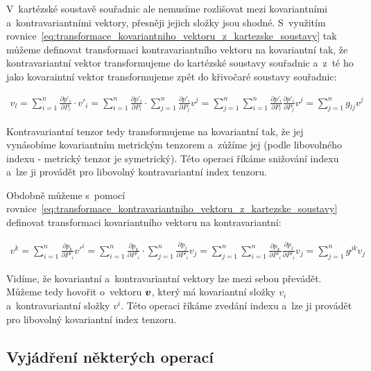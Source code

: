 V~kartézské soustavě souřadnic ale nemusíme rozlišovat mezi kovariantními a~kontravariantními vektory, přesněji jejich složky jsou shodné. S~využitím rovnice~\eqref{eq:transformace_kovariantniho_vektoru_z_kartezske_soustavy} tak můžeme definovat transformaci kontravariantního vektoru na kovariantní tak, že kontravariantní vektor transformujeme do kartézské soustavy souřadnic a~z~té ho jako kovaraintní vektor transformujeme zpět do křivočaré soustavy souřadnic:

\begin{equation}
\begin{split}
v_l = \sum_{i=1}^n \frac{\partial p'_i}{\partial P_l} \cdot v'_i = \sum_{i=1}^n \frac{\partial p'_i}{\partial P_l} \cdot \sum_{j=1}^n \frac{\partial p'_i}{\partial P_j} v^j = \sum_{j=1}^n \sum_{i=1}^n \frac{\partial p'_i}{\partial P_l} \frac{\partial p'_i}{\partial P_j} v^j = \sum_{j=1}^n g_{lj} v^j
\end{split}
\end{equation}

Kontravariantní tenzor tedy transformujeme na kovariantní tak, že jej vynásobíme kovariantním metrickým tenzorem a~zůžíme jej (podle libovolného indexu - metrický tenzor je symetrický). Této operaci říkáme snižování indexu a~lze ji provádět pro libovolný kontravariantní index tenzoru.

Obdobně můžeme s~pomocí rovnice~\eqref{eq:transformace_kontravariantniho_vektoru_z_kartezske_soustavy} definovat transformaci kovariantního vektoru na kontravariantní:

\begin{equation}
\begin{split}
v^k = \sum_{i=1}^n \frac{\partial p_k}{\partial P'_i} v'^i = \sum_{i=1}^n \frac{\partial p_k}{\partial P'_i} \cdot \sum_{j=1}^n \frac{\partial p_j}{\partial P'_i} v_j = \sum_{j=1}^n \sum_{i=1}^n \frac{\partial p_k}{\partial P'_i} \frac{\partial p_j}{\partial P'_i} v_j = \sum_{j=1}^n g^{jk} v_j
\end{split}
\end{equation}

Vidíme, že kovariantní a~kontravariantní vektory lze mezi sebou převádět. Můžeme tedy hovořit o~vektoru \(\boldsymbol{v}\), který má kovariantní složky \(v_i\) a~kontravariantní složky \(v^i\). Této operaci říkáme zvedání indexu a~lze ji provádět pro libovolný kovariantní index tenzoru.

\subsection{Vyjádření některých operací}

